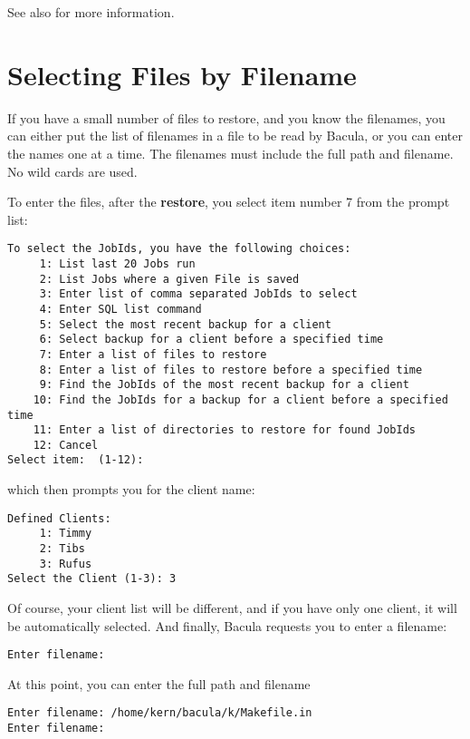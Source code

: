   See also  for more information.

\section{Selecting Files by Filename}

If you have a small number of files to restore, and you know the filenames,
you can either put the list of filenames in a file to be read by Bacula, or
you can enter the names one at a time. The filenames must include the full
path and filename. No wild cards are used. 

To enter the files, after the {\bf restore}, you select item number 7 from the
prompt list: 

\footnotesize
\begin{verbatim}
To select the JobIds, you have the following choices:
     1: List last 20 Jobs run
     2: List Jobs where a given File is saved
     3: Enter list of comma separated JobIds to select
     4: Enter SQL list command
     5: Select the most recent backup for a client
     6: Select backup for a client before a specified time
     7: Enter a list of files to restore
     8: Enter a list of files to restore before a specified time
     9: Find the JobIds of the most recent backup for a client
    10: Find the JobIds for a backup for a client before a specified time
    11: Enter a list of directories to restore for found JobIds
    12: Cancel
Select item:  (1-12):
\end{verbatim}
\normalsize

which then prompts you for the client name: 

\footnotesize
\begin{verbatim}
Defined Clients:
     1: Timmy
     2: Tibs
     3: Rufus
Select the Client (1-3): 3
\end{verbatim}
\normalsize

Of course, your client list will be different, and if you have only one
client, it will be automatically selected. And finally, Bacula requests you to
enter a filename: 

\footnotesize
\begin{verbatim}
Enter filename:
\end{verbatim}
\normalsize

At this point, you can enter the full path and filename 

\footnotesize
\begin{verbatim}
Enter filename: /home/kern/bacula/k/Makefile.in
Enter filename:
\end{verbatim}
\normalsize


